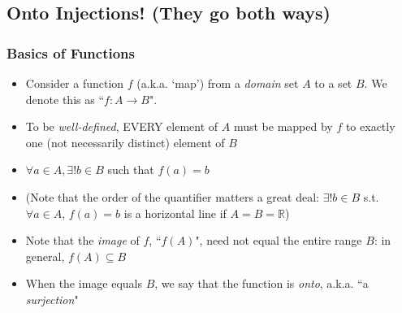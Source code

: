 \subsection{Onto Injections! (They go both ways)}

\begin{frame}
\frametitle{Basics of Functions}

\begin{itemize}[<+->]

\item Consider a function $f$ (a.k.a. `map') from a \emph{domain} set $A$ to a  set $B$. We denote this as ``$f: A \rightarrow B$". 

\item To be \emph{well-defined}, EVERY element of $A$ must be mapped by $f$ to exactly one (not necessarily distinct) element of $B$

\item[] $\forall a \in A, \exists ! b \in B$ such that $f(a) = b$

\item[] (Note that the order of the quantifier matters a great deal: $\exists ! b \in B$ s.t. $\forall a \in A$,  $f(a) = b$ is a horizontal line if $A = B = \mathbb{R}$)

\item Note that the \emph{image} of $f$, ``$f(A)$", need not equal the entire range $B$: in general, $f(A) \subseteq B$

\item When the image equals $B$, we say that the function is \emph{onto}, a.k.a. ``a \emph{surjection}"

\end{itemize}
\end{frame}

